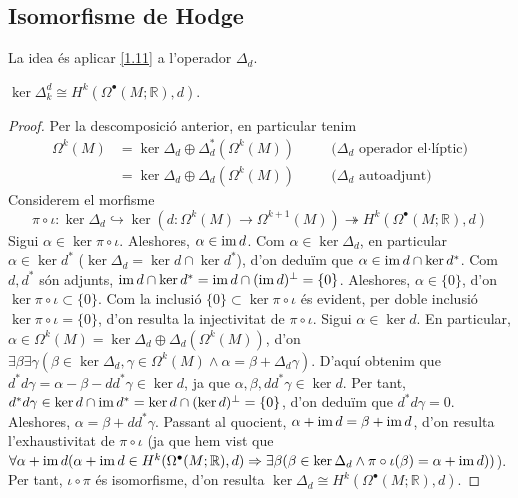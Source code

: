 \subsection{Isomorfisme de Hodge}
La idea és aplicar \ref{1.11} a l'operador $\Delta_{d}$.
\begin{teorema}\label{1.12}
    $\ker{\Delta_{k}^{d}}\cong H^{k}(\Omega^{\bullet}(M;\mathbb{R}),d)$.
    \begin{proof}
        Per la descomposició anterior, en particular tenim
        \begin{align*}
            \Omega^{k}(M)
            &=\ker{\Delta_{d}}\oplus\Delta_{d}^{*}(\Omega^{k}(M))
            &\quad&\textrm{($\Delta_{d}$ operador el·líptic)}\\
            &=\ker{\Delta_{d}}\oplus\Delta_{d}(\Omega^{k}(M))
            &\quad&\textrm{($\Delta_{d}$ autoadjunt)}
        \end{align*}
        Considerem el morfisme
        \begin{equation*}
            \pi\circ\iota:
            \ker{\Delta_{d}}
            \hookrightarrow\ker(d:\Omega^{k}(M)\rightarrow\Omega^{k+1}(M))
            \twoheadrightarrow H^{k}(\Omega^{\bullet}(M;\mathbb{R}),d)
        \end{equation*}
        Sigui $\alpha\in\ker{\pi\circ\iota}$. Aleshores, $\alpha\in\operatorname{im}{d}$. Com $\alpha\in\ker{\Delta_{d}}$, en particular $\alpha\in\ker{d^{*}}$ ($\ker{\Delta_{d}}=\ker{d}\cap\ker{d^{*}}$), d'on deduïm que $\alpha\in\operatorname{im}{d}\cap\ker{d^{*}}$. Com $d,d^{*}$ són adjunts, $\operatorname{im}{d}\cap\ker{d^{*}}=\operatorname{im}{d}\cap(\operatorname{im}{d})^{\perp}=\{0\}$. Aleshores, $\alpha\in\{0\}$, d'on $\ker{\pi\circ\iota}\subset\{0\}$. Com la inclusió $\{0\}\subset\ker{\pi\circ\iota}$ és evident, per doble inclusió $\ker{\pi\circ\iota}=\{0\}$, d'on resulta la injectivitat de $\pi\circ\iota$.\newline
        Sigui $\alpha\in\ker{d}$. En particular, $\alpha\in\Omega^{k}(M)=\ker{\Delta_{d}}\oplus\Delta_{d}(\Omega^{k}(M))$, d'on $\exists\beta\exists\gamma(\beta\in\ker{\Delta_{d}},\gamma\in\Omega^{k}(M)\land\alpha=\beta+\Delta_{d}\gamma)$. D'aquí obtenim que $d^{*}d\gamma=\alpha-\beta-dd^{*}\gamma\in\ker{d}$, ja que $\alpha,\beta,dd^{*}\gamma\in\ker{d}$. Per tant, $d^{*}d\gamma\in\ker{d}\cap\operatorname{im}{d^{*}}=\ker{d}\cap(\ker{d})^{\perp}=\{0\}$, d'on deduïm que $d^{*}d\gamma=0$. Aleshores, $\alpha=\beta+dd^{*}\gamma$. Passant al quocient, $\alpha+\operatorname{im}{d}=\beta+\operatorname{im}{d}$, d'on resulta l'exhaustivitat de $\pi\circ\iota$ (ja que hem vist que $\forall\alpha+\operatorname{im}{d}(\alpha+\operatorname{im}{d}\in H^{k}(\Omega^{\bullet}(M;\mathbb{R}),d)\Rightarrow\exists\beta(\beta\in\ker{\Delta_{d}}\land\pi\circ\iota(\beta)=\alpha+\operatorname{im}{d}))$).\newline
        Per tant, $\iota\circ\pi$ és isomorfisme, d'on resulta $\ker{\Delta_{d}}\cong H^{k}(\Omega^{\bullet}(M;\mathbb{R}),d)$.
    \end{proof}
\end{teorema}
